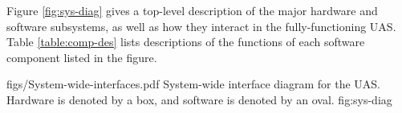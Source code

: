 \documentclass[]{auvsi_doc}
\begin{document}
\begin{AUVSITitlePage}
\begin{artifacttable}
\end{artifacttable}
\end{AUVSITitlePage}

Figure \ref{fig:sys-diag} gives a top-level description of the major hardware and software subsystems, as well as how they interact in the fully-functioning UAS. Table \ref{table:comp-des} lists descriptions of the functions of each software component listed in the figure.

\vspace{0.3cm}

\AUVSIFigure
{{figs/System-wide-interfaces.pdf}}
{\textwidth}
{System-wide interface diagram for the UAS. Hardware is denoted by a box, and software is denoted by an oval.}
{fig:sys-diag}
\end{document}
